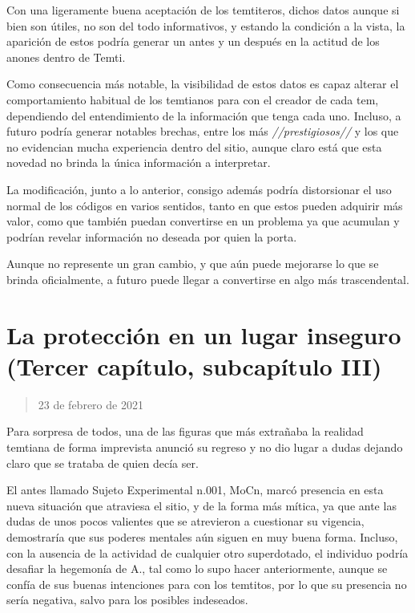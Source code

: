 \documentclass[
  spanish,
]{book}
\begin{document}
Con una ligeramente buena aceptación de los temtiteros, dichos datos aunque si bien son útiles, no son del todo informativos, y estando la condición a la vista, la aparición de estos podría generar un antes y un después en la actitud de los anones dentro de Temti.

Como consecuencia más notable, la visibilidad de estos datos es capaz alterar el comportamiento habitual de los temtianos para con el creador de cada tem, dependiendo del entendimiento de la información que tenga cada uno. Incluso, a futuro podría generar notables brechas, entre los más \emph{//prestigiosos//} y los que no evidencian mucha experiencia dentro del sitio, aunque claro está que esta novedad no brinda la única información a interpretar.

La modificación, junto a lo anterior, consigo además podría distorsionar el uso normal de los códigos en varios sentidos, tanto en que estos pueden adquirir más valor, como que también puedan convertirse en un problema ya que acumulan y podrían revelar información no deseada por quien la porta.

Aunque no represente un gran cambio, y que aún puede mejorarse lo que se brinda oficialmente, a futuro puede llegar a convertirse en algo más trascendental.

\hypertarget{la-protecciuxf3n-en-un-lugar-inseguro-tercer-capuxedtulo-subcapuxedtulo-iii}{%
\section{La protección en un lugar inseguro (Tercer capítulo, subcapítulo III)}\label{la-protecciuxf3n-en-un-lugar-inseguro-tercer-capuxedtulo-subcapuxedtulo-iii}}

\begin{quote}
23 de febrero de 2021
\end{quote}

Para sorpresa de todos, una de las figuras que más extrañaba la realidad temtiana de forma imprevista anunció su regreso y no dio lugar a dudas dejando claro que se trataba de quien decía ser.

El antes llamado Sujeto Experimental n.001, MoCn, marcó presencia en esta nueva situación que atraviesa el sitio, y de la forma más mítica, ya que ante las dudas de unos pocos valientes que se atrevieron a cuestionar su vigencia, demostraría que sus poderes mentales aún siguen en muy buena forma. Incluso, con la ausencia de la actividad de cualquier otro superdotado, el individuo podría desafiar la hegemonía de A., tal como lo supo hacer anteriormente, aunque se confía de sus buenas intenciones para con los temtitos, por lo que su presencia no sería negativa, salvo para los posibles indeseados.
\end{document}
